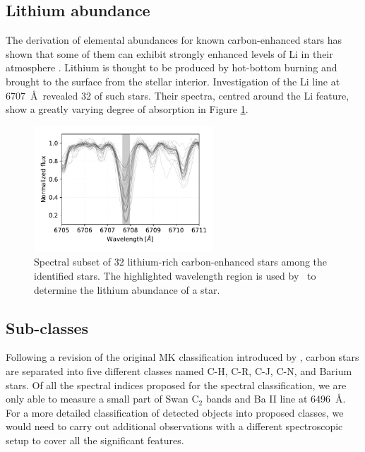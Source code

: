 \subsection{Lithium abundance}
\label{sec:lithium}
The derivation of elemental abundances for known carbon-enhanced stars has shown that some of them can exhibit strongly enhanced levels of Li in their atmosphere \cite{1991A&A...245L...1A}. Lithium is thought to be produced by hot-bottom burning \cite{1974ApJ...187..555S} and brought to the surface from the stellar interior. Investigation of the Li line at 6707~\AA\ revealed 32 of such stars. Their spectra, centred around the Li feature, show a greatly varying degree of absorption in Figure \ref{fig:li_abund}.

\begin{figure}
	\centering
	\includegraphics[width=0.6\textwidth]{li_string_ch.pdf}
	\caption{Spectral subset of 32 lithium-rich carbon-enhanced stars among the identified stars. The highlighted wavelength region is used by \TC\ to determine the lithium abundance of a star.}
	\label{fig:li_abund}
\end{figure}

\subsection{Sub-classes}
\label{sec:subclasses}
Following a revision of the original MK classification \cite{1941ApJ....94..501K} introduced by \citet{1996ApJS..105..419B}, carbon stars are separated into five different classes named \mbox{C-H}, \mbox{C-R}, \mbox{C-J}, \mbox{C-N}, and Barium stars. Of all the spectral indices proposed for the spectral classification, we are only able to measure a small part of Swan C$_2$ bands and Ba II line at 6496~\AA. For a more detailed classification of detected objects into proposed classes, we would need to carry out additional observations with a different spectroscopic setup to cover all the significant features. 

